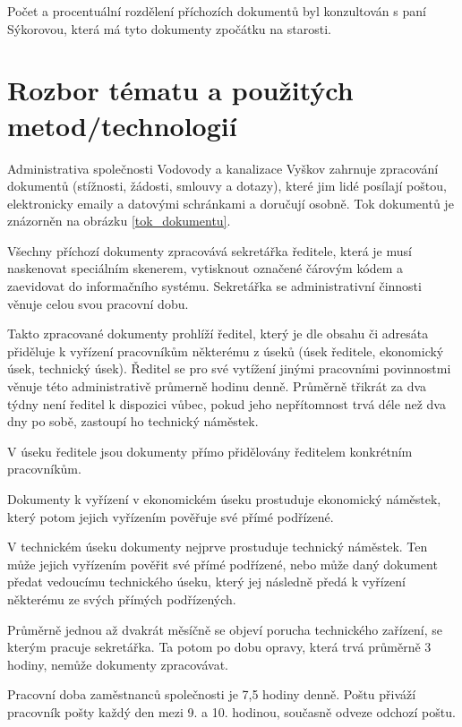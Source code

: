 \documentclass[12pt,a4paper]{article}
\begin{document}
Počet a procentuální rozdělení příchozích dokumentů byl konzultován s paní Sýkorovou, která má tyto dokumenty zpočátku na starosti.

\newpage


\section{Rozbor tématu a použitých metod/technologií}

Administrativa společnosti Vodovody a kanalizace Vyškov zahrnuje zpracování dokumentů (stížnosti, žádosti, smlouvy a dotazy), které jim lidé posílají poštou, elektronicky emaily a datovými schránkami a doručují osobně. Tok dokumentů je znázorněn na obrázku \ref{tok_dokumentu}.

Všechny příchozí dokumenty zpracovává sekretářka ředitele, která je musí naskenovat speciálním skenerem, vytisknout označené čárovým kódem a zaevidovat do informačního systému. Sekretářka se administrativní činnosti věnuje celou svou pracovní dobu.

Takto zpracované dokumenty prohlíží ředitel, který je dle obsahu či adresáta při\-dě\-lu\-je k vyřízení pracovníkům některému z úseků (úsek ředitele, ekonomický úsek, technický úsek). Ředitel se pro své vytížení jinými pracovními povinnostmi věnuje této administrativě průmerně hodinu denně.
Průměrně třikrát za dva týdny není ředitel k dispozici vůbec, pokud jeho nepřítomnost trvá déle než dva dny po sobě, zastoupí ho technický náměstek.

V úseku ředitele jsou dokumenty přímo přidělovány ředitelem konkrétním pra\-cov\-ní\-kům.

Dokumenty k vyřízení v ekonomickém úseku prostuduje ekonomický náměstek, který potom jejich vyřízením pověřuje své přímé podřízené.

V technickém úseku dokumenty nejprve prostuduje technický náměstek. Ten může jejich vyřízením pověřit své přímé podřízené, nebo může daný dokument předat vedoucímu technického úseku, který jej následně předá k vyřízení některému ze svých přímých podřízených.

Průměrně jednou až dvakrát měsíčně se objeví porucha technického zařízení, se kterým pracuje sekretářka. Ta potom po dobu opravy, která trvá průměrně 3 hodiny, nemůže dokumenty zpracovávat.

Pracovní doba zaměstnanců společnosti je 7,5 hodiny denně. Poštu přiváží pracovník pošty každý den mezi 9. a 10. hodinou, současně odveze odchozí poštu.
\end{document}

